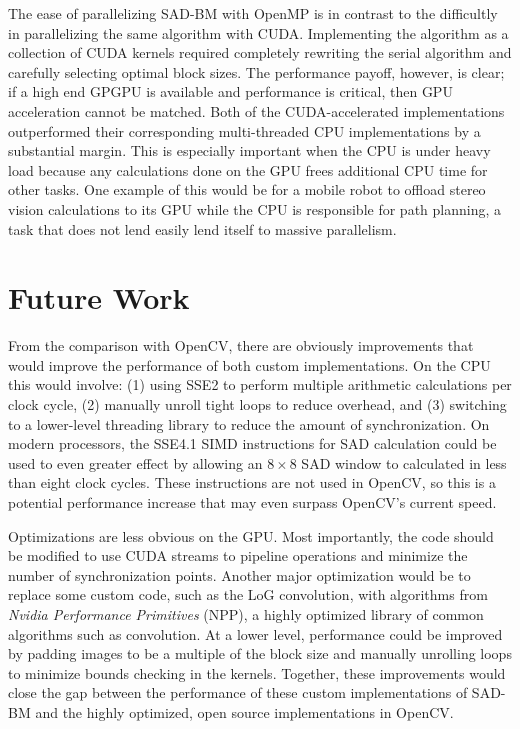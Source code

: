 \documentclass{article}
\begin{document}
The ease of parallelizing SAD-BM with OpenMP is in contrast to the difficultly
in parallelizing the same algorithm with CUDA. Implementing the algorithm as a
collection of CUDA kernels required completely rewriting the serial algorithm
and carefully selecting optimal block sizes. The performance payoff, however,
is clear; if a high end GPGPU is available and performance is critical, then
GPU acceleration cannot be matched. Both of the CUDA-accelerated
implementations outperformed their corresponding multi-threaded CPU
implementations by a substantial margin. This is especially important when the
CPU is under heavy load because any calculations done on the GPU frees
additional CPU time for other tasks. One example of this would be for a mobile
robot to offload stereo vision calculations to its GPU while the CPU is
responsible for path planning, a task that does not lend easily lend itself to
massive parallelism.

\section{Future Work}
\label{sec:future}
From the comparison with OpenCV, there are obviously improvements that would
improve the performance of both custom implementations. On the CPU this
would involve: (1) using SSE2 to perform multiple arithmetic calculations per
clock cycle, (2) manually unroll tight loops to reduce overhead, and (3)
switching to a lower-level threading library to reduce the amount of
synchronization. On modern processors, the SSE4.1 SIMD instructions for SAD
calculation could be used to even greater effect by allowing an $8 \times 8$
SAD window to calculated in less than eight clock cycles. These instructions
are not used in OpenCV, so this is a potential performance increase that may
even surpass OpenCV's current speed.

Optimizations are less obvious on the GPU. Most importantly, the code should be
modified to use CUDA streams to pipeline operations and minimize the number of
synchronization points. Another major optimization would be to replace some
custom code, such as the LoG convolution, with algorithms from \textit{Nvidia
Performance Primitives} (NPP), a highly optimized library of common algorithms
such as convolution.  At a lower level, performance could be improved by
padding images to be a multiple of the block size and manually unrolling loops
to minimize bounds checking in the kernels. Together, these improvements would
close the gap between the performance of these custom implementations of SAD-BM
and the highly optimized, open source implementations in OpenCV.

{}

\end{document}
